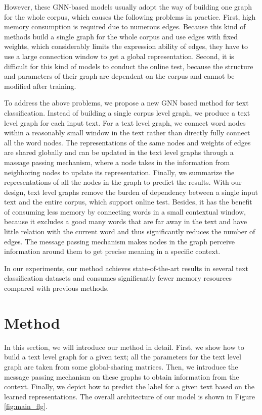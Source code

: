 \documentclass[11pt,a4paper]{article}
\begin{document}
However, these GNN-based models usually adopt the way of building one graph for the whole corpus, which causes the following problems in practice.
First, high memory consumption is required due to numerous edges. Because this kind of methods build a single graph for the whole corpus and use edges with fixed weights, which considerably limits the expression ability of edges, they have to use a large connection window to get a global representation. 
Second, it is difficult for this kind of models to conduct the online test, because the structure and parameters of their graph are dependent on the corpus and cannot be modified after training.


To address the above problems, we propose a new GNN based method for text classification. Instead of building a single corpus level graph, we produce a text level graph for each input text. For a text level graph, we connect word nodes within a reasonably small window in the text rather than directly fully connect all the word nodes. The representations of the same nodes and weights of edges are shared globally and can be updated in the text level graphs through a massage passing mechanism, where a node takes in the information from neighboring nodes to update its representation. Finally, we summarize the representations of all the nodes in the graph to predict the results. 
With our design, text level graphs remove the burden of dependency between a single input text and the entire corpus, which support online test. 
Besides,  
it has the benefit of consuming less memory by connecting words in a small contextual window, because it excludes a good many words that are far away in the text and have little relation with the current word and thus significantly reduces the number of edges.
The message passing mechanism makes nodes in the graph perceive information around them to get precise meaning in a specific context. 


In our experiments, our method achieves state-of-the-art results in several text classification datasets and consumes significantly fewer memory resources compared with previous methods. 





\section{Method}


In this section, we will introduce our method in detail. 
First, we show how to build a text level graph for a given text; all the parameters for the text level graph are taken from some global-sharing matrices. 
Then, we introduce the message passing mechanism on these graphs to obtain information from the context. 
Finally, we depict how to predict the label for a given text based on the learned representations.
The overall architecture of our model is shown in Figure \ref{fig:main_flg}.
\end{document}

